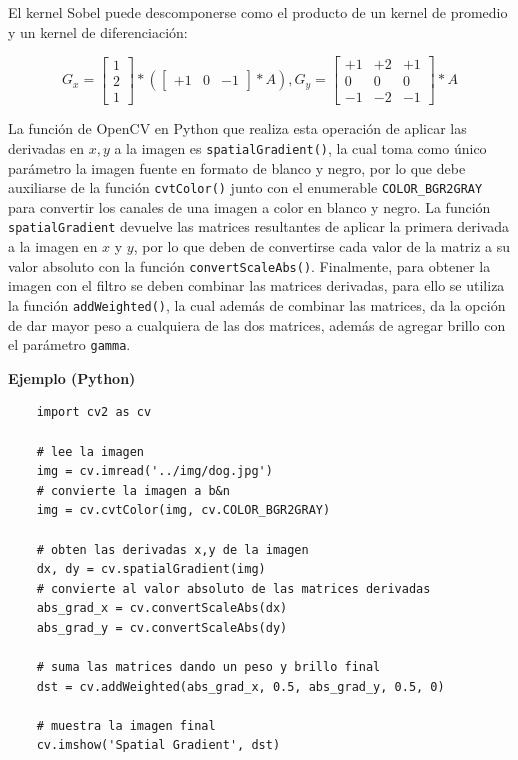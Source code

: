 \documentclass[a4paper, 12pt]{article}
\begin{document}
El kernel Sobel puede descomponerse como el producto de un kernel de promedio y un kernel de diferenciación:

\begin{equation}
    G_x
    =
    \begin{bmatrix}
        1 \\
        2 \\
        1
    \end{bmatrix}
    *(
    \begin{bmatrix}
        +1 & 0 & -1
    \end{bmatrix}
    *
    A
    ),
    G_y
    =
    \begin{bmatrix}
        +1 & +2 & +1 \\
        0  & 0  & 0  \\
        -1 & -2 & -1
    \end{bmatrix}
    *
    A
\end{equation}

La función de OpenCV en Python que realiza esta operación de aplicar las derivadas en $x,y$ a la imagen es \lstinline{spatialGradient()}, la cual toma como único parámetro la imagen fuente en formato de blanco y negro, por lo que debe auxiliarse de la función \lstinline{cvtColor()} junto con el enumerable \lstinline{COLOR_BGR2GRAY} para convertir los canales de una imagen a color en blanco y negro. La función \lstinline{spatialGradient} devuelve las matrices resultantes de aplicar la primera derivada a la imagen en $x$ y $y$, por lo que deben de convertirse cada valor de la matriz a su valor absoluto con la función \lstinline{convertScaleAbs()}. Finalmente, para obtener la imagen con el filtro se deben combinar las matrices derivadas, para ello se utiliza la función \lstinline{addWeighted()}, la cual además de combinar las matrices, da la opción de dar mayor peso a cualquiera de las dos matrices, además de agregar brillo con el parámetro \lstinline{gamma}.

\textbf{Ejemplo (Python)}

\begin{lstlisting}
    import cv2 as cv

    # lee la imagen
    img = cv.imread('../img/dog.jpg')
    # convierte la imagen a b&n
    img = cv.cvtColor(img, cv.COLOR_BGR2GRAY)

    # obten las derivadas x,y de la imagen
    dx, dy = cv.spatialGradient(img)
    # convierte al valor absoluto de las matrices derivadas
    abs_grad_x = cv.convertScaleAbs(dx)
    abs_grad_y = cv.convertScaleAbs(dy)

    # suma las matrices dando un peso y brillo final
    dst = cv.addWeighted(abs_grad_x, 0.5, abs_grad_y, 0.5, 0)

    # muestra la imagen final
    cv.imshow('Spatial Gradient', dst)
\end{lstlisting}
\end{document}
